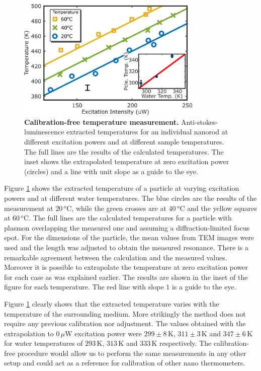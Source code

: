 \documentclass[journal=nalefd,manuscript=letter]{achemso}
\newcommand{\K}{\ensuremath{\,\textrm{K}}}
\newcommand{\uW}{\ensuremath{\,\mu\textrm{W}}}
\newcommand{\degree}{\ensuremath{\,^o\textrm{C}}}
\begin{document}
\begin{figure}[tp] \centering
\includegraphics[width=88.4mm]{Figures/03_Fit_Of_AS/03_Log_Fit_AS_02.png}
\caption{\textbf{Calibration-free temperature measurement.}
Anti-stokes-luminescence extracted temperatures for an individual nanorod
at different excitation powers and at different sample temperatures. 
The full lines are the results of the calculated temperatures. The inset shows the extrapolated temperature at zero
excitation power (circles) and a line with unit slope as a guide to the eye.}
	\label{fig:AS_temp}
\end{figure}


Figure \ref{fig:AS_temp} shows the extracted temperature of a particle at
varying excitation powers and at different water temperatures. The blue circles
are the results of the measurement at $20\degree$, while the green crosses are
at $40\degree$ and the yellow squares at $60\degree$. The full lines are the
calculated temperatures for a particle with plasmon overlapping the measured one
and assuming a diffraction-limited focus spot. For the dimensions of the
particle, the mean values from TEM images were used and the length was adjusted
to obtain the measured resonance. There is a remarkable agreement between the
calculation and the measured values. Moreover it is possible to extrapolate the
temperature at zero excitation power for each case as was explained earlier. The
results are shown in the inset of the figure for each temperature. The red line
with slope $1$ is a guide to the eye.

Figure \ref{fig:AS_temp} clearly shows that the extracted temperature varies
with the temperature of the surrounding medium. More strikingly the method does
not require any previous calibration nor adjustment. The values obtained with
the extrapolation to $0\uW$ excitation power were $299 \pm 8\K$, $311\pm 3\K$
and $347 \pm 6\K$ for water temperatures of $293\K$, $313\K$ and $333\K$
respectively. The calibration-free procedure would allow us to perform the same
measurements in any other setup and could act as a reference for calibration of
other nano thermometers.
\end{document}
